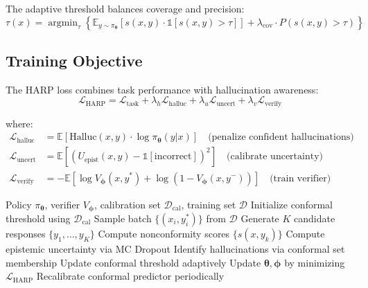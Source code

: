 \documentclass[11pt,a4paper]{article}
\newcommand{\E}{\mathbb{E}}
\newcommand{\argmin}{\operatorname{argmin}}
\newcommand{\calL}{\mathcal{L}}
\newcommand{\calD}{\mathcal{D}}
\newcommand{\btheta}{\bm{\theta}}
\newcommand{\bphi}{\bm{\phi}}
\begin{document}
The adaptive threshold balances coverage and precision:
\begin{equation}
    \tau(x) = \argmin_\tau \left\{ \E_{y \sim \pi_\btheta}[s(x,y) \cdot \mathbb{1}[s(x,y) > \tau]] + \lambda_{\text{cov}} \cdot P(s(x,y) > \tau) \right\}
\end{equation}

\subsection{Training Objective}

The HARP loss combines task performance with hallucination awareness:
\begin{equation}
    \calL_{\text{HARP}} = \calL_{\text{task}} + \lambda_h \calL_{\text{halluc}} + \lambda_u \calL_{\text{uncert}} + \lambda_v \calL_{\text{verify}}
\end{equation}

where:
\begin{align}
    \calL_{\text{halluc}} &= \E\left[\text{Halluc}(x, y) \cdot \log \pi_\btheta(y|x)\right] \quad \text{(penalize confident hallucinations)} \\
    \calL_{\text{uncert}} &= \E\left[(U_{\text{epist}}(x,y) - \mathbb{1}[\text{incorrect}])^2\right] \quad \text{(calibrate uncertainty)} \\
    \calL_{\text{verify}} &= -\E\left[\log V_\bphi(x, y^*) + \log(1 - V_\bphi(x, y^-))\right] \quad \text{(train verifier)}
\end{align}

\begin{algorithm}[t]
\caption{HARP Training}
\label{alg:harp}
\begin{algorithmic}[1]
\REQUIRE Policy $\pi_\btheta$, verifier $V_\bphi$, calibration set $\calD_{\text{cal}}$, training set $\calD$
\STATE Initialize conformal threshold using $\calD_{\text{cal}}$
    \STATE Sample batch $\{(x_i, y_i^*)\}$ from $\calD$
        \STATE Generate $K$ candidate responses $\{y_1, \ldots, y_K\}$
        \STATE Compute nonconformity scores $\{s(x, y_k)\}$
        \STATE Compute epistemic uncertainty via MC Dropout
        \STATE Identify hallucinations via conformal set membership
        \STATE Update conformal threshold adaptively
    \ENDFOR
    \STATE Update $\btheta, \bphi$ by minimizing $\calL_{\text{HARP}}$
    \STATE Recalibrate conformal predictor periodically
\ENDFOR
\end{algorithmic}
\end{algorithm}
\end{document}
